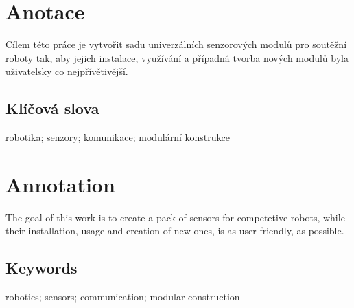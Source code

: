 \documentclass{template/socthesis}
\author{Tomáš Rohlínek}
\begin{document}
	\maketitle
	
	
	
	\pagestyle{empty}
	
	\section*{Anotace}
	Cílem této práce je vytvořit sadu univerzálních senzorových modulů pro soutěžní roboty tak, aby jejich instalace, využívání a případná tvorba nových modulů byla uživatelsky co nejpřívětivější.
	
	\subsection*{Klíčová slova}
	robotika; senzory; komunikace; modulární konstrukce
	
	\vspace{20mm}
	
	\section*{Annotation}
	The goal of this work is to create a pack of sensors for competetive robots, while their installation, usage and creation of new ones, is as user friendly, as possible. 
	
	\subsection*{Keywords}
	robotics; sensors; communication; modular construction
	
	\newpage
	\pagestyle{plain}
	
	\tableofcontents %
	
	\setcounter{figure}{0}
	\setcounter{table}{0}
	\newpage
	
	
	
	
	
	
	
	
	
	
	
	
	
	
	
	
	\newpage
	\printbibliography[title=Literatura]
	
	\listoffigures
	
	\listoftables
	
	
\end{document}
